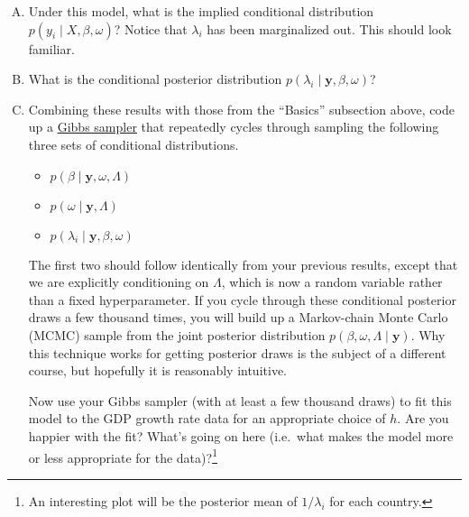 \documentclass{mynotes}
\newcommand{\by}{\textbf{y}}
\begin{document}
\begin{enumerate}[(A)]


\item Under this model, what is the implied conditional distribution $p(y_i \mid X, \beta, \omega)$?  Notice that $\lambda_i$ has been marginalized out.  This should look familiar.

\item What is the conditional posterior distribution $p(\lambda_i \mid \by, \beta, \omega)$?

\item Combining these results with those from the ``Basics'' subsection above, code up a \href{http://en.wikipedia.org/wiki/Gibbs_sampling}{Gibbs sampler} that repeatedly cycles through sampling the following three sets of conditional distributions.
\begin{itemize}
\item $p(\beta \mid \by, \omega, \Lambda)$
\item $p(\omega \mid \by, \Lambda)$
\item $p(\lambda_i \mid \by, \beta, \omega)$
\end{itemize}
The first two should follow identically from your previous results, except that we are explicitly conditioning on $\Lambda$, which is now a random variable rather than a fixed hyperparameter.  If you cycle through these conditional posterior draws a few thousand times, you will build up a Markov-chain Monte Carlo (MCMC) sample from the joint posterior distribution $p(\beta, \omega, \Lambda \mid \by)$.  Why this technique works for getting posterior draws is the subject of a different course, but hopefully it is reasonably intuitive.

Now use your Gibbs sampler (with at least a few thousand draws) to fit this model to the GDP growth rate data for an appropriate choice of $h$.  Are you happier with the fit?  What's going on here (i.e.~what makes the model more or less appropriate for the data)?\footnote{An interesting plot will be the posterior mean of $1/\lambda_i$ for each country.}

\end{enumerate}
\end{document}
